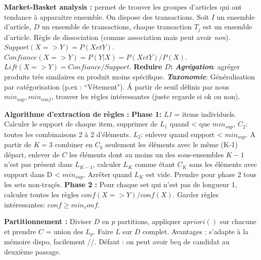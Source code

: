 \documentclass[9pt,a4paper]{report}
\begin{document}
\textbf{Market-Basket analysis :} permet de trouver les groupes d'articles qui ont tendance à apparaitre ensemble. On dispose des transactions. Soit $I$ un ensemble d'article, $D$ un ensemble de transactions, chaque transaction $T_j$ est un ensemble d'article. Règle de dissociation (comme association mais peut avoir \textit{non}).
$Support(X => Y) = P ( X et Y )$.
$Confiance( X =>Y ) = P ( Y | X ) = P ( X et Y ) / P (X)$.
$Lift(X => Y)= Confiance / Support$. \textbf{Reduire $D$:} \textit{\textbf{Agrégation}}: agréger produits très similaires en produit moins spécifique. \textit{\textbf{Taxonomie}}: Généralisation par catégorisation (p.ex : “Vêtement"). Á partir de seuil définis par nous $min_{sup}, min_{conf}$, trouver les règles intéressantes (juste regarde si ok ou non).

\textbf{Algorithme d'extraction de règles :} \textbf{Phase 1:} \textit{L1} = items individuels. Calculer le support de chaque item, supprimer de $L_1$ quand < que $min_{sup}$, \textit{$C_2$}: toutes les combinaisons 2 à 2 d'éléments. \textit{$L_2$}: enlever quand support < $min_{sup}$. A partir de $K=3$ combiner en $C_k$ seulement les éléments avec le même (K-1) départ, enlever de $C$ les éléments dont au moins un des sous-ensembles $K-1$ n'est pas présent dans $L_{K-1}$, calculer $L_K$ comme étant $C_K$ sans les éléments avec support dans D < $min_{sup}$. Arrêter quand $L_K$ est vide. Prendre pour phase 2 tous les sets non-traçés.
\textbf{Phase 2 :} Pour chaque set qui n'est pas de longueur 1, calculer toutes les règles $conf(X=>Y)/conf(X)$. Garder règles intéressantes: $conf \geq min_conf$.

\textbf{Partitionnement :} Diviser $D$ en $p$ partitions, appliquer $apriori()$ sur chacune et prendre $C$ = union des $L_p$. Faire $L$ sur $D$ complet. Avantages : s'adapte à la mémoire dispo, facilement //. Défaut : on peut avoir bcq de candidat au deuxième passage.
\end{document}
